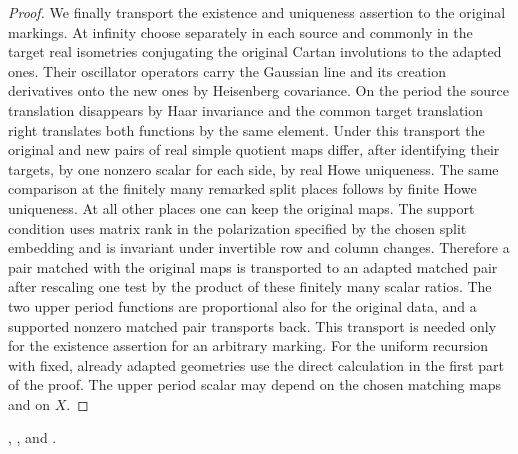 \begin{proof}
We finally transport the existence and uniqueness assertion to the
original markings. At infinity choose separately in each source
and commonly in the target real isometries conjugating the original
Cartan involutions to the adapted ones. Their oscillator operators
carry the Gaussian line and its creation derivatives onto the new
ones by Heisenberg covariance. On the period the source translation
disappears by Haar invariance and the common target translation
right translates both functions by the same element. Under this
transport the original and new pairs of real simple quotient maps
differ, after identifying their targets, by one nonzero scalar
for each side, by real Howe uniqueness. The same comparison at
the finitely many remarked split places follows by finite Howe
uniqueness. At all other places one can keep the original maps.
The support condition uses matrix rank in the polarization
specified by the chosen split embedding and is invariant under
invertible row and column changes. Therefore a pair matched with
the original maps is transported to an adapted matched pair after
rescaling one test by the product of these finitely many scalar
ratios. The two upper period functions are proportional also for
the original data, and a supported nonzero matched pair transports
back. This transport is needed only for the existence assertion
for an arbitrary marking. For the uniform recursion with fixed,
already adapted geometries use the direct calculation in the
first part of the proof. The upper period scalar may depend on
the chosen matching maps and on \(X\).
\end{proof}
,
, and
.
